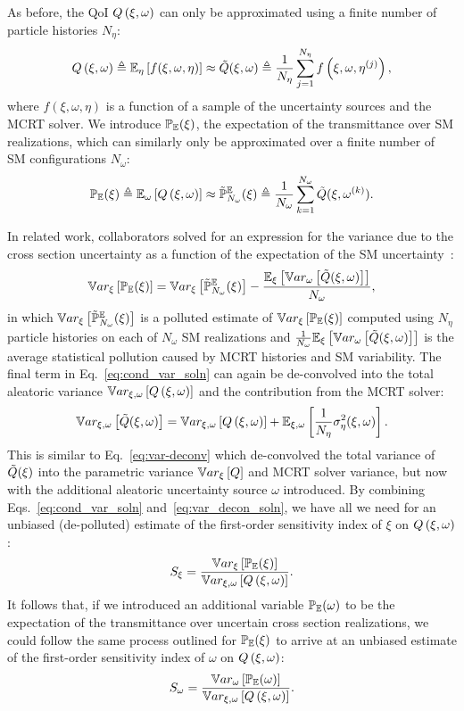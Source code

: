 As before, the QoI $Q\left(\xi,\omega\right)$ can only be approximated using a finite number of particle histories $N_\eta$:
\begin{equation} \label{eq:stochastic_solver_sampling}
 Q\left(\xi,\omega\right) \triangleq \mathbb{E}_\eta\left[ f(\xi, \omega, \eta) \right] \approx \tilde{Q}(\xi,\omega) \triangleq \frac{1}{{N_\eta}} \sum_{j=1}^{{N_\eta}} f\left( \xi, \omega, \eta^{(j)} \right),
\end{equation}
where $f(\xi,\omega,\eta)$ is a function of a sample of the uncertainty sources and the MCRT solver. We introduce ${\mathbb{P}_{\mathbb{E}}}(\xi)$, the expectation of the transmittance over SM realizations, which can similarly only be approximated over a finite number of SM configurations $N_\omega$:
\begin{equation}\label{eq:PE}
 {\mathbb{P}_{\mathbb{E}}}(\xi) \triangleq \mathbb{E}_\omega\left[ Q\left(\xi,\omega\right) \right] \approx \tilde{\mathbb{P}}^{\mathbb{E}}_{{N_\omega}}(\xi) \triangleq \frac{1}{{N_\omega}} \sum_{k=1}^{{N_\omega}} \tilde{Q}(\xi,\omega^{(k)}).
\end{equation}

In related work, collaborators solved for an expression for the variance due to the cross section uncertainty as a function of the expectation of the SM uncertainty~\cite{GeraciANS2022}:
\begin{equation}\label{eq:cond_var_soln}
 \mathbb{V}ar_\xi\left[ {\mathbb{P}_{\mathbb{E}}}(\xi) \right] = \mathbb{V}ar_\xi\left[ \tilde{\mathbb{P}}^{\mathbb{E}}_{{N_\omega}}(\xi) \right] - \frac{ \mathbb{E}_\xi\left[ \mathbb{V}ar_\omega\left[\tilde{Q}(\xi,\omega)\right] \right] }{{N_\omega}},
\end{equation}
in which $\mathbb{V}ar_\xi\left[ \tilde{\mathbb{P}}^{\mathbb{E}}_{{N_\omega}}(\xi) \right]$ is a polluted estimate of $\mathbb{V}ar_\xi\left[ {\mathbb{P}_{\mathbb{E}}}(\xi) \right]$ computed using $N_\eta$ particle histories on each of $N_\omega$ SM realizations and $\frac{1}{N_\omega}\mathbb{E}_\xi\left[ \mathbb{V}ar_\omega\left[\tilde{Q}(\xi,\omega)\right] \right]$ is the average statistical pollution caused by MCRT histories and SM variability. The final term in Eq.~\eqref{eq:cond_var_soln} can again be de-convolved into the total aleatoric variance $\mathbb{V}ar_{\xi,\omega}\left[Q\left(\xi,\omega\right)\right]$ and the contribution from the MCRT solver:
\begin{equation}\label{eq:var_decon_soln}
    \mathbb{V}ar_{\xi,\omega}\left[\tilde{Q}(\xi,\omega)\right] = \mathbb{V}ar_{\xi,\omega}\left[Q\left(\xi,\omega\right)\right] + \mathbb{E}_{\xi,\omega}\left[\frac{1}{{N_\eta}}\sigma^2_\eta(\xi,\omega)\right].
\end{equation}
This is similar to Eq.~\eqref{eq:var-deconv} which de-convolved the total variance of $\tilde{Q}(\xi)$ into the parametric variance $\mathbb{V}ar_\xi\left[Q\right]$ and MCRT solver variance, but now with the additional aleatoric uncertainty source $\omega$ introduced. By combining Eqs.~\eqref{eq:cond_var_soln} and~\eqref{eq:var_decon_soln}, we have all we need for an unbiased (de-polluted) estimate of the first-order sensitivity index of $\xi$ on $Q\left(\xi,\omega\right)$:
\begin{equation}\label{eq:Sxi}
S_\xi=\frac{\mathbb{V}ar_\xi\left[{\mathbb{P}_{\mathbb{E}}}(\xi)\right]}{\mathbb{V}ar_{\xi,\omega}\left[Q\left(\xi,\omega\right)\right]}.
\end{equation}
It follows that, if we introduced an additional variable ${\mathbb{P}_{\mathbb{E}}}(\omega)$ to be the expectation of the transmittance over uncertain cross section realizations, we could follow the same process outlined for ${\mathbb{P}_{\mathbb{E}}}(\xi)$ to arrive at an unbiased estimate of the first-order sensitivity index of $\omega$ on $Q\left(\xi,\omega\right)$:
\begin{equation}\label{eq:Som}
S_\omega=\frac{\mathbb{V}ar_\omega\left[{\mathbb{P}_{\mathbb{E}}}(\omega)\right]}{\mathbb{V}ar_{\xi,\omega}\left[Q\left(\xi,\omega\right)\right]}.
\end{equation}

